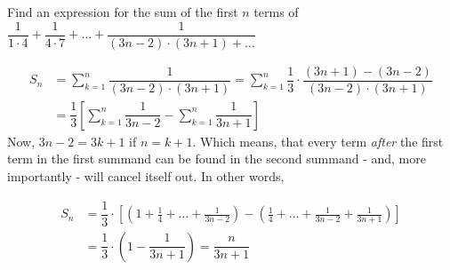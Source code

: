 
%
%
%
%
% 
% 

\question Find an expression for the sum of the first $n$ terms of 
$\dfrac{1}{1\cdot 4} + \dfrac{1}{4\cdot 7} + \ldots + \dfrac{1}{(3n-2)\cdot(3n+1) + \ldots}$

\insertQR{}

\ifprintanswers
\fi 

\begin{solution}
	\begin{align}
		S_n &= \sum_{k=1}^{n}\dfrac{1}{(3n-2)\cdot(3n+1)} = 
		\sum_{k=1}^{n}\dfrac{1}{3}\cdot\dfrac{(3n+1) - (3n-2)}{(3n-2)\cdot(3n+1)} \\
		&= \dfrac{1}{3}\left[ \sum_{k=1}^{n}\dfrac{1}{3n-2} - \sum_{k=1}^{n}\dfrac{1}{3n+1}\right]
	\end{align}
	Now, $3n-2 = 3k + 1$ if $n = k + 1$. Which means, that every term \textit{after} the first
	term in the first summand can be found in the second summand - and, more importantly - will 
	cancel itself out. In other words,
	
	\begin{align}
		S_n &= \dfrac{1}{3}\cdot\left[\left( 1+\frac{1}{4}+\ldots +\frac{1}{3n-2}\right)
		- \left( \frac{1}{4} + \ldots + \frac{1}{3n-2} + \frac{1}{3n+1}\right) \right] \\
		&= \dfrac{1}{3}\cdot\left( 1-\dfrac{1}{3n+1}\right) = \dfrac{n}{3n+1}
	\end{align}
\end{solution}
